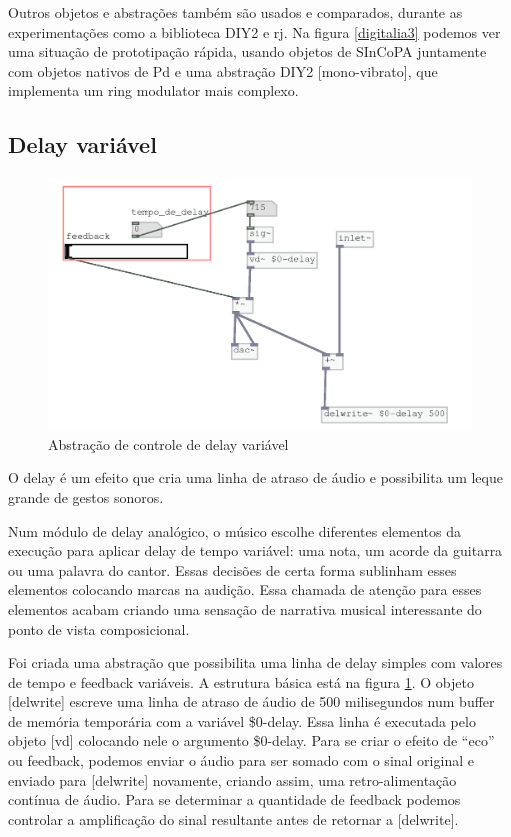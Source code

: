 \documentclass{ppgmus}
\begin{document}
Outros objetos e abstrações também são usados e comparados, durante as experimentações
como a biblioteca DIY2 e rj. Na figura \ref{digitalia3} podemos ver uma situação de prototipação
rápida, usando objetos de SInCoPA juntamente com objetos nativos de Pd e uma abstração DIY2 [mono-vibrato],
que implementa um ring modulator mais complexo. 

\subsection{Delay variável}


\begin{figure}
\includegraphics[scale=.5]{sinc-delay}
\caption{Abstração de controle de delay variável}
\label{sinc-delay}
\end{figure}


O delay é um efeito que cria uma linha de atraso de áudio e possibilita
um leque grande de gestos sonoros.

Num módulo  de delay analógico, o músico escolhe diferentes elementos
da execução para aplicar delay de tempo variável: uma nota, um acorde 
da guitarra ou uma palavra do cantor. Essas decisões de certa forma 
sublinham esses elementos colocando marcas na audição. Essa chamada de
atenção para esses elementos acabam criando uma sensação de narrativa musical
interessante do ponto de vista composicional.

Foi criada uma abstração que possibilita uma linha de delay simples com valores
de tempo e feedback variáveis. A estrutura básica está na figura \ref{sinc-delay}. O objeto 
[delwrite\texttildelow] escreve uma linha de atraso de áudio de 500 milisegundos
num buffer de memória temporária com a variável \$0-delay. Essa linha é executada
pelo objeto [vd\texttildelow] colocando nele o argumento \$0-delay. Para se criar
o efeito de ``eco'' ou feedback, podemos enviar o áudio para ser somado com o sinal
original e enviado para [delwrite\texttildelow] novamente, criando assim, uma retro-alimentação
contínua de áudio. Para se determinar a quantidade de feedback podemos controlar a 
amplificação do sinal resultante antes de retornar a [delwrite\texttildelow].
\end{document}
